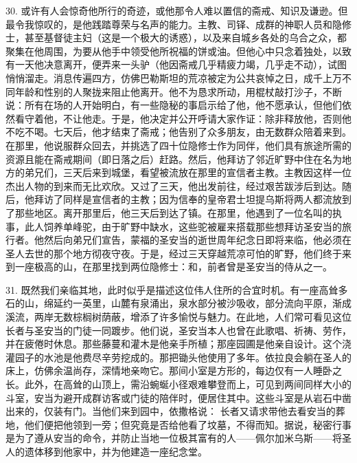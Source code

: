 30. 或许有人会惊奇他所行的奇迹，或他那令人难以置信的斋戒、知识及谦逊。但最令我惊叹的，是他践踏尊荣与名声的能力。主教、司铎、成群的神职人员和隐修士，甚至基督徒主妇（这是一个极大的诱惑），以及来自城乡各处的乌合之众，都聚集在他周围，为要从他手中领受他所祝福的饼或油。但他心中只念着独处，以致有一天他决意离开，便弄来一头驴（他因斋戒几乎精疲力竭，几乎走不动），试图悄悄溜走。消息传遍四方，仿佛巴勒斯坦的荒凉被定为公共哀悼之日，成千上万不同年龄和性别的人聚拢来阻止他离开。他不为恳求所动，用棍杖敲打沙子，不断说：所有在场的人开始明白，有一些隐秘的事启示给了他，他不愿承认，但他们依然看守着他，不让他走。于是，他决定并公开呼请大家作证：除非释放他，否则他不吃不喝。七天后，他才结束了斋戒；他告别了众多朋友，由无数群众陪着来到。在那里，他说服群众回去，并挑选了四十位隐修士作为同伴，他们具有旅途所需的资源且能在斋戒期间（即日落之后）赶路。然后，他拜访了邻近旷野中住在名为地方的弟兄们，三天后来到城堡，看望被流放在那里的宣信者主教。主教因这样一位杰出人物的到来而无比欢欣。又过了三天，他出发前往，经过艰苦跋涉后到达。随后，他拜访了同样是宣信者的主教；因为信奉的皇帝君士坦提乌斯将两人都流放到了那些地区。离开那里后，他三天后到达了镇。在那里，他遇到了一位名叫的执事，此人饲养单峰驼，由于旷野中缺水，这些驼被雇来搭载那些想拜访圣安当的旅行者。他然后向弟兄们宣告，蒙福的圣安当的逝世周年纪念日即将来临，他必须在圣人去世的那个地方彻夜守夜。于是，经过三天穿越荒凉可怕的旷野，他们终于来到一座极高的山，在那里找到两位隐修士：和，前者曾是圣安当的侍从之一。\par

31. 既然我们亲临其地，此时似乎是描述这位伟人住所的合宜时机。有一座高耸多石的山，绵延约一英里，山麓有泉涌出，泉水部分被沙吸收，部分流向平原，渐成溪流，两岸无数棕榈树荫蔽，增添了许多愉悦与魅力。在此地，人们常可看见这位长者与圣安当的门徒一同踱步。他们说，圣安当本人也曾在此歌唱、祈祷、劳作，并在疲倦时休息。那些藤蔓和灌木是他亲手所植；那座园圃是他亲自设计。这个浇灌园子的水池是他费尽辛劳挖成的。那把锄头他使用了多年。依拉良会躺在圣人的床上，仿佛余温尚存，深情地亲吻它。那间小室是方形的，每边仅有一人睡卧之长。此外，在高耸的山顶上，需沿蜿蜒小径艰难攀登而上，可见到两间同样大小的斗室，安当为避开成群访客或门徒的陪伴时，便居住其中。这些斗室是从岩石中凿出来的，仅装有门。当他们来到园中，依撒格说： 长者又请求带他去看安当的葬地，他们便把他领到一旁；但究竟是否给他看了坟墓，不得而知。据说，秘密行事是为了遵从安当的命令，并防止当地一位极其富有的人——佩尔加米乌斯——将圣人的遗体移到他家中，并为他建造一座纪念堂。\par

